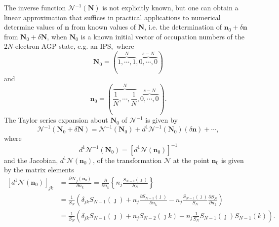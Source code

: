 \documentclass[aps,preprint]{revtex4}%
\begin{document}
The inverse function $\mathcal{N}^{-1}\left(  \mathbf{N}\right)  $ is not
explicitly known, but one can obtain a linear approximation that suffices in
practical applications to numerical determine values of $\mathbf{n}$ from
known values of $\mathbf{N}$, i.e. the determination of $\mathbf{n}_{0}%
+\delta\mathbf{n}$ from $\mathbf{N}_{0}+\delta\mathbf{N}$, when $\mathbf{N}%
_{0}$ is a known initial vector of occupation numbers of the $2N$-electron AGP
state, e.g. an IPS,\ where
\begin{equation}
\mathbf{N}_{0}=\left(  \overset{N}{\overbrace{1,\cdots,1}},\overset
{s-N}{\overbrace{0,\cdots,0}}\right)
\end{equation}
and
\begin{equation}
\mathbf{n}_{0}=\left(  \overset{N}{\overbrace{\frac{1}{N},\cdots,\frac{1}{N}}%
},\overset{s-N}{\overbrace{0,\cdots,0}}\right)  .
\end{equation}
The Taylor series expansion about $\mathbf{N}_{0}$ of $\mathcal{N}^{-1}$ is
given by%
\begin{equation}
\mathcal{N}^{-1}\left(  \mathbf{N}_{0}+\delta\mathbf{N}\right)  =\mathcal{N}%
^{-1}\left(  \mathbf{N}_{0}\right)  +d^{1}\mathcal{N}^{-1}\left(
\mathbf{N}_{0}\right)  \left(  \delta\mathbf{n}\right)  +\cdots,
\end{equation}
where
\begin{equation}
d^{1}\mathcal{N}^{-1}\left(  \mathbf{N}_{0}\right)  =\left[  d^{1}%
\mathcal{N}\left(  \mathbf{n}_{0}\right)  \right]  ^{-1}%
\end{equation}
and the Jacobian, $d^{1}\mathcal{N}\left(  \mathbf{n}_{0}\right)  $, of the
transformation $\mathcal{N}$ at the point $\mathbf{n}_{0}$ is given by the
matrix elements
\begin{align}
\left[  d^{1}\mathcal{N}\left(  \mathbf{n}_{0}\right)  \right]  _{jk}  &
=\frac{\partial\mathcal{N}_{j}\left(  \mathbf{n}_{0}\right)  }{\partial n_{k}%
}=\frac{\partial}{\partial n_{k}}\left\{  n_{j}\frac{S_{N-1}\left(
\jmath\right)  }{S_{N}}\right\} \nonumber\\
&  =\frac{1}{S_{N}}\left(  \delta_{jk}S_{N-1}\left(  \jmath\right)
+n_{j}\frac{\partial S_{N-1}\left(  \jmath\right)  }{\partial n_{k}}%
-n_{j}\frac{S_{N-1}\left(  \jmath\right)  }{S_{N}}\frac{\partial S_{N}%
}{\partial n_{k}}\right) \nonumber\\
&  =\frac{1}{S_{N}}\left(  \delta_{jk}S_{N-1}\left(  \jmath\right)
+n_{j}S_{N-2}\left(  \jmath k\right)  -n_{j}\frac{1}{S_{N}}S_{N-1}\left(
\jmath\right)  S_{N-1}\left(  k\right)  \right)  .
\end{align}
\end{document}
